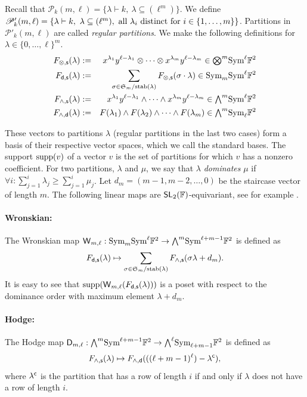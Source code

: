 \documentclass[a4paper]{extarticle}
\newcommand{\aS}{\mathfrak{S}}
\newcommand{\IF}{\mathbb{F}}
\newcommand{\SL}{\textsf{\textup{SL}}}
\newcommand{\Wedge}{{\textstyle\bigwedge}}
\newcommand{\tensor}{{\textstyle\bigotimes}}
\newcommand{\Sym}{\textup{Sym}}
\newcommand{\la}{\lambda}
\newcommand{\supp}{\textup{supp}}
\renewcommand{\c}{\textup{\textsf{c}}}
\newcommand{\stab}{\textup{stab}}
\newcommand{\Hodge}{\textsf{\textup{D}}}
\newcommand{\Wronski}{\textsf{\textup{W}}}
\renewcommand{\d}{\mathsf{d}}
\newcommand{\s}{\mathsf{s}}
\numberwithin{theorem}{section}
\theoremstyle{definition}
\begin{document}
Recall that $\mathscr P_k(m,\ell) = \{\la \vdash k, \ \la\subseteq (\ell^m)\}$.
We define $\mathscr P'_k(m,\ell) = \{\la \vdash k, \ \la\subseteq (\ell^m), \ \textup{all $\la_i$ distinct for $i\in\{1,\ldots,m\}$}\}$. Partitions in $\mathscr P'_k(m,\ell)$ are called \emph{regular partitions}.
We make the following definitions for $\la\in\{0,\ldots,\ell\}^m$.
\begin{eqnarray*}
F_{\otimes,\s}(\la) &:=& x^{\la_1}y^{\ell-\la_1}\otimes \cdots \otimes x^{\la_m}y^{\ell-\la_m} \in \tensor^m \Sym^\ell \IF^2
\\
F_{\d,\s}(\lambda) &:=& \sum_{\sigma\in \aS_m/\stab(\la)} F_{\otimes,\s}(\sigma\cdot \la) \in \Sym_m \Sym^\ell \IF^2
\\
F_{\wedge,\s}(\lambda) &:=& x^{\la_1}y^{\ell-\la_1}\wedge \cdots \wedge x^{\la_m}y^{\ell-\la_m} \in \Wedge^m\Sym^\ell \IF^2
\\
F_{\wedge,\d}(\lambda) &:=&
F(\la_1) \wedge F(\la_2) \wedge \cdots \wedge F(\la_m)
\in \Wedge^m\Sym_\ell \IF^2
\end{eqnarray*}

These vectors to partitions $\la$ (regular partitions in the last two cases) form a basis of their respective vector spaces, which we call the standard bases.
The support $\supp(v)$ of a vector $v$ is the set of partitions for which $v$ has a nonzero coefficient.
For two partitions, $\la$ and $\mu$, we say that $\la$ \emph{dominates} $\mu$ if $\forall i:\sum_{j=1}^i\la_j\geq\sum_{j=1}^i\mu_j$.
Let $d_m=(m-1,m-2,\dots,0)$ be the staircase vector of length $m$.
The following linear maps are $\SL_2(\IF)$-equivariant, see for example \cite{MW:22}.

\paragraph{Wronskian:}The Wronskian map $\Wronski_{m,\ell} : \Sym_m\Sym^\ell \IF^2 \to\Wedge^m \Sym^{\ell+m-1} \IF^2$ is defined as
\[
F_{\d,\s}(\la) \mapsto \sum_{\sigma\in \aS_m/\stab (\la)} F_{\wedge,\s} (\sigma\la + d_m).
\]
It is easy to see that $\supp(\Wronski_{m,\ell}(F_{\d,\s}(\la)))$ is a poset with respect to the dominance order with maximum element $\la+d_m$.

\paragraph{Hodge:}
The Hodge map $\Hodge_{m,\ell} : \Wedge^m \Sym^{\ell+m-1} \IF^2 \to \Wedge^\ell \Sym_{\ell+m-1} \IF^2$ is defined as
\[
F_{\wedge,\s}(\la) \mapsto F_{\wedge,\d}(((\ell+m-1)^\ell)-\la^\c),
\]
where $\la^\c$ is the partition that has a row of length $i$ if and only if $\la$ does not have a row of length $i$.
\end{document}
